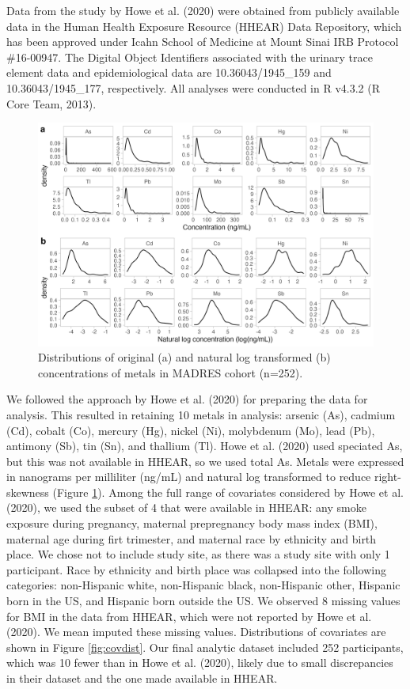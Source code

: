 \documentclass[12pt, twoside]{amherstthesis}
\begin{document}
Data from the study by Howe et al. (2020) were obtained from publicly available data in the Human Health Exposure Resource (HHEAR) Data Repository, which has been approved under Icahn School of Medicine at Mount Sinai IRB Protocol \#16-00947. The Digital Object Identifiers associated with the urinary trace element data and epidemiological data are 10.36043/1945\_159 and 10.36043/1945\_177, respectively. All analyses were conducted in R v4.3.2 (R Core Team, 2013).
\begin{figure}

{\centering \includegraphics[width=0.9\linewidth]{figures/ch4_univlog} 

}

\caption{Distributions of original (a) and natural log transformed (b) concentrations of metals in MADRES cohort (n=252).}\label{fig:logtransf}
\end{figure}
We followed the approach by Howe et al. (2020) for preparing the data for analysis. This resulted in retaining 10 metals in analysis: arsenic (As), cadmium (Cd), cobalt (Co), mercury (Hg), nickel (Ni), molybdenum (Mo), lead (Pb), antimony (Sb), tin (Sn), and thallium (Tl). Howe et al. (2020) used speciated As, but this was not available in HHEAR, so we used total As. Metals were expressed in nanograms per milliliter (ng/mL) and natural log transformed to reduce right-skewness (Figure \ref{fig:logtransf}). Among the full range of covariates considered by Howe et al. (2020), we used the subset of 4 that were available in HHEAR: any smoke exposure during pregnancy, maternal prepregnancy body mass index (BMI), maternal age during firt trimester, and maternal race by ethnicity and birth place. We chose not to include study site, as there was a study site with only 1 participant. Race by ethnicity and birth place was collapsed into the following categories: non-Hispanic white, non-Hispanic black, non-Hispanic other, Hispanic born in the US, and Hispanic born outside the US. We observed 8 missing values for BMI in the data from HHEAR, which were not reported by Howe et al. (2020). We mean imputed these missing values. Distributions of covariates are shown in Figure \ref{fig:covdist}. Our final analytic dataset included 252 participants, which was 10 fewer than in Howe et al. (2020), likely due to small discrepancies in their dataset and the one made available in HHEAR.
\end{document}
